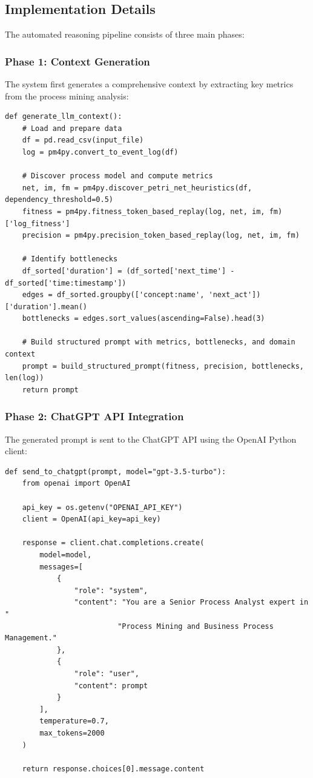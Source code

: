 \documentclass[a4paper,twoside,12pt]{article}
\begin{document}
\subsection{Implementation Details}

The automated reasoning pipeline consists of three main phases:

\subsubsection{Phase 1: Context Generation}

The system first generates a comprehensive context by extracting key metrics from the process mining analysis:

\begin{lstlisting}[caption={Context generation for LLM}]
def generate_llm_context():
    # Load and prepare data
    df = pd.read_csv(input_file)
    log = pm4py.convert_to_event_log(df)
    
    # Discover process model and compute metrics
    net, im, fm = pm4py.discover_petri_net_heuristics(df, dependency_threshold=0.5)
    fitness = pm4py.fitness_token_based_replay(log, net, im, fm)['log_fitness']
    precision = pm4py.precision_token_based_replay(log, net, im, fm)
    
    # Identify bottlenecks
    df_sorted['duration'] = (df_sorted['next_time'] - df_sorted['time:timestamp'])
    edges = df_sorted.groupby(['concept:name', 'next_act'])['duration'].mean()
    bottlenecks = edges.sort_values(ascending=False).head(3)
    
    # Build structured prompt with metrics, bottlenecks, and domain context
    prompt = build_structured_prompt(fitness, precision, bottlenecks, len(log))
    return prompt
\end{lstlisting}

\subsubsection{Phase 2: ChatGPT API Integration}

The generated prompt is sent to the ChatGPT API using the OpenAI Python client:

\begin{lstlisting}[caption={ChatGPT API call implementation}]
def send_to_chatgpt(prompt, model="gpt-3.5-turbo"):
    from openai import OpenAI
    
    api_key = os.getenv("OPENAI_API_KEY")
    client = OpenAI(api_key=api_key)
    
    response = client.chat.completions.create(
        model=model,
        messages=[
            {
                "role": "system",
                "content": "You are a Senior Process Analyst expert in "
                          "Process Mining and Business Process Management."
            },
            {
                "role": "user",
                "content": prompt
            }
        ],
        temperature=0.7,
        max_tokens=2000
    )
    
    return response.choices[0].message.content
\end{lstlisting}
\end{document}
